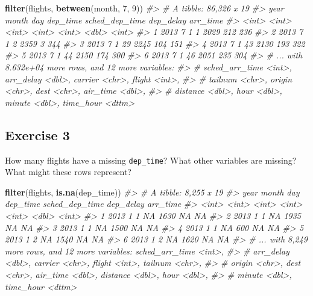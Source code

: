\documentclass[]{book}
\newenvironment{Shaded}{\begin{snugshade}}{\end{snugshade}}
\newcommand{\CommentTok}[1]{\textcolor[rgb]{0.56,0.35,0.01}{\textit{#1}}}
\newcommand{\DecValTok}[1]{\textcolor[rgb]{0.00,0.00,0.81}{#1}}
\newcommand{\KeywordTok}[1]{\textcolor[rgb]{0.13,0.29,0.53}{\textbf{#1}}}
\newcommand{\NormalTok}[1]{#1}
\theoremstyle{plain}
\theoremstyle{remark}
\theoremstyle{definition}
\theoremstyle{definition}
\theoremstyle{definition}
\theoremstyle{remark}
\begin{document}
\begin{Shaded}
\begin{Highlighting}[]
\KeywordTok{filter}\NormalTok{(flights, }\KeywordTok{between}\NormalTok{(month, }\DecValTok{7}\NormalTok{, }\DecValTok{9}\NormalTok{))}
\CommentTok{#> # A tibble: 86,326 x 19}
\CommentTok{#>    year month   day dep_time sched_dep_time dep_delay arr_time}
\CommentTok{#>   <int> <int> <int>    <int>          <int>     <dbl>    <int>}
\CommentTok{#> 1  2013     7     1        1           2029       212      236}
\CommentTok{#> 2  2013     7     1        2           2359         3      344}
\CommentTok{#> 3  2013     7     1       29           2245       104      151}
\CommentTok{#> 4  2013     7     1       43           2130       193      322}
\CommentTok{#> 5  2013     7     1       44           2150       174      300}
\CommentTok{#> 6  2013     7     1       46           2051       235      304}
\CommentTok{#> # ... with 8.632e+04 more rows, and 12 more variables:}
\CommentTok{#> #   sched_arr_time <int>, arr_delay <dbl>, carrier <chr>, flight <int>,}
\CommentTok{#> #   tailnum <chr>, origin <chr>, dest <chr>, air_time <dbl>,}
\CommentTok{#> #   distance <dbl>, hour <dbl>, minute <dbl>, time_hour <dttm>}
\end{Highlighting}
\end{Shaded}

\hypertarget{exercise-3-5}{%
\subsection{Exercise 3}\label{exercise-3-5}}

How many flights have a missing \texttt{dep\_time}? What other variables
are missing? What might these rows represent?

\begin{Shaded}
\begin{Highlighting}[]
\KeywordTok{filter}\NormalTok{(flights, }\KeywordTok{is.na}\NormalTok{(dep_time))}
\CommentTok{#> # A tibble: 8,255 x 19}
\CommentTok{#>    year month   day dep_time sched_dep_time dep_delay arr_time}
\CommentTok{#>   <int> <int> <int>    <int>          <int>     <dbl>    <int>}
\CommentTok{#> 1  2013     1     1       NA           1630        NA       NA}
\CommentTok{#> 2  2013     1     1       NA           1935        NA       NA}
\CommentTok{#> 3  2013     1     1       NA           1500        NA       NA}
\CommentTok{#> 4  2013     1     1       NA            600        NA       NA}
\CommentTok{#> 5  2013     1     2       NA           1540        NA       NA}
\CommentTok{#> 6  2013     1     2       NA           1620        NA       NA}
\CommentTok{#> # ... with 8,249 more rows, and 12 more variables: sched_arr_time <int>,}
\CommentTok{#> #   arr_delay <dbl>, carrier <chr>, flight <int>, tailnum <chr>,}
\CommentTok{#> #   origin <chr>, dest <chr>, air_time <dbl>, distance <dbl>, hour <dbl>,}
\CommentTok{#> #   minute <dbl>, time_hour <dttm>}
\end{Highlighting}
\end{Shaded}
\end{document}

